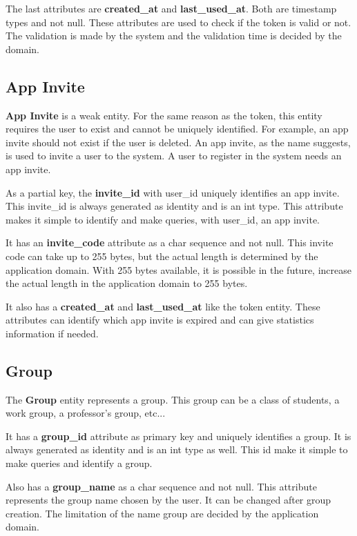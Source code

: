 \documentclass[a4paper,twoside,11pt]{article}
\begin{document}
The last attributes are \textbf{created\_at} and \textbf{last\_used\_at}. Both are timestamp types and not null. These attributes are used to check if the token is valid or not. The validation is made by the system and the validation time is decided by the domain.

\subsection*{App Invite}
\textbf{App Invite} is a weak entity. For the same reason as the token, this entity requires the user to exist and cannot be uniquely identified. For example, an app invite should not exist if the user is deleted. An app invite, as the name suggests, is used to invite a user to the system.
A user to register in the system needs an app invite. 

As a partial key, the \textbf{invite\_id} with user\_id uniquely identifies an app invite. This invite\_id is always generated as identity and is an int type. This attribute makes it simple to identify and make queries, with user\_id, an app invite.  

It has an \textbf{invite\_code} attribute as a char sequence and not null. This invite code can take up to 255 bytes, but the actual length is determined by the application domain. With 255 bytes available, it is possible in the future, increase the actual length in the application domain to 255 bytes.

It also has a \textbf{created\_at} and \textbf{last\_used\_at} like the token entity. These attributes can identify which app invite is expired and can give statistics information if needed.

\subsection*{Group}
The \textbf{Group} entity represents a group. This group can be a class of students, a work group, a professor's group, etc...

It has a \textbf{group\_id} attribute as primary key and uniquely identifies a group. It is always generated as identity and is an int type as well. This id make it simple to make queries and identify a group.

Also has a \textbf{group\_name} as a char sequence and not null. This attribute represents the group name chosen by the user. It can be changed after group creation. The limitation of the name group are decided by the application domain. 
\end{document}
